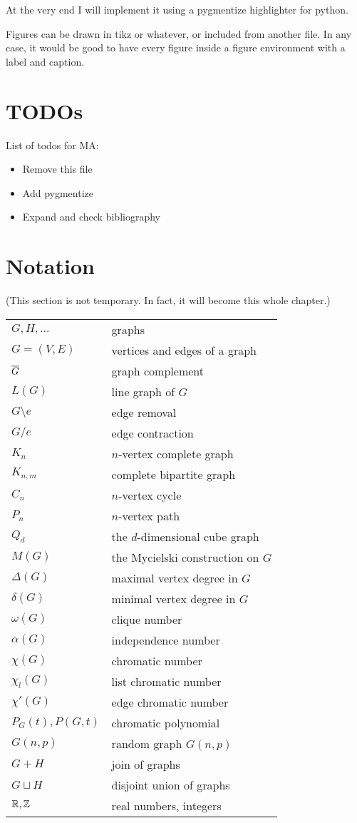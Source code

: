 At the very end I will implement it using a pygmentize highlighter for python.

Figures can be drawn in tikz or whatever, or included from another file. In any case, it would be good to have every figure inside a figure environment with a label and caption.

\section{TODOs}
List of todos for MA:
\begin{itemize}
\item Remove this file
\item Add pygmentize
\item Expand and check bibliography
\end{itemize}


\section{Notation}
(This section is not temporary. In fact, it will become this whole chapter.)

\begin{center}
\begin{tabular}{ll}
$G, H, \ldots$          	&  graphs \\
$G=(V,E)$					&  vertices and edges of a graph \\
$\overline{G}$					&  graph complement \\
$L(G)$						&  line graph of $G$ \\
$G\setminus e$				&  edge removal \\
$G/e$						&  edge contraction \\
$K_n$						&  $n$-vertex complete graph \\
$K_{n,m}$					&  complete bipartite graph \\
$C_n$						&  $n$-vertex cycle \\
$P_n$						&  $n$-vertex path \\
$Q_d$						&  the $d$-dimensional cube graph \\
$M(G)$						&  the Mycielski construction on $G$ \\
$\Delta(G)$					&  maximal vertex degree in $G$ \\
$\delta(G)$					&  minimal vertex degree in $G$ \\
$\omega(G)$					&  clique number \\
$\alpha(G)$					&  independence number \\
$\chi(G)$					&  chromatic number \\
$\chi_l(G)$					&  list chromatic number \\
$\chi'(G)$					&  edge chromatic number \\
$P_G(t), P(G,t)$			&  chromatic polynomial \\
$G(n,p)$					&  random graph $G(n,p)$ \\
$G+H$						&  join of graphs \\
$G\sqcup H$					&  disjoint union of graphs \\
$\mathbb{R}, \mathbb{Z}$					& real numbers, integers
\end{tabular}
\end{center}